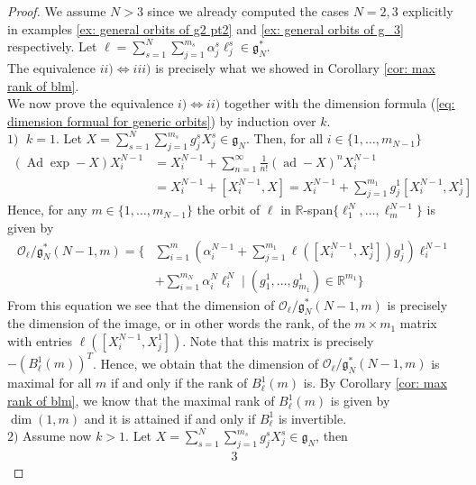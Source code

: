 \documentclass[10pt,a4paper]{amsart}
\newcommand{\Adjoint}{\operatorname{Ad}}
\newcommand{\fancyg}{\mathfrak{g}}
\begin{document}
	\begin{proof}
		We assume $N > 3$ since we already computed the cases $N=2,3$ explicitly in examples \ref{ex: general orbits of g2 pt2} and \ref{ex: general orbits of g_3} respectively.
		Let $\ell = \sum_{s=1}^{N}\sum_{j=1}^{m_s}\alpha_j^s\ell_j^s \in \fancyg_{N}^*$.\\
		The equivalence $ii) \iff iii)$ is precisely what we showed in Corollary \ref{cor: max rank of blm}.\\   
		We now prove the equivalence $i) \iff ii)$ together with the dimension formula (\ref{eq: dimension formual for generic orbits}) by induction over $k$.\\
		$1)\;$ $k = 1$. Let $X = \sum_{s=1}^{N}\sum_{j=1}^{m_s}g_j^sX_j^s \in \fancyg_{N}$. Then, for all $i \in \{1, \ldots, m_{N-1}\}$
		\begin{align*}
			(\Adjoint \operatorname{exp}-X)X_i^{N-1} &= X_i^{N-1} + \sum_{n=1}^{\infty}\frac{1}{n!}(\operatorname{ad}-X)^n X_i^{N-1}\\
			&=  X_i^{N-1} + [X_i^{N-1}, X] = X_i^{N-1} + \sum_{j=1}^{m_1}g_j^1[X_i^{N-1},X_j^1]
		\end{align*}
		Hence, for any $m \in \{1, \ldots, m_{N-1}\}$ the orbit of $\ell$ in $\mathbb{R}$-span$\{\ell_1^N, \ldots, \ell_{m}^{N-1}\}$ is given by
		\begin{align*}
			\mathcal{O}_{\ell} / \fancyg_N^*(N-1, m) = \Bigg\{ 
			& \sum_{i=1}^{m} \left(\alpha_i^{N-1} + \sum_{j=1}^{m_1} \ell([X_i^{N-1}, X_j^1])g_j^1\right) \ell_i^{N-1} \\
			& + \sum_{i=1}^{m_N} \alpha_i^N \ell_i^N \; \Big| \; (g_1^1, \ldots, g_{m_1}^1) \in \mathbb{R}^{m_1} \Bigg\}
		\end{align*}
		From this equation we see that the dimension of $\mathcal{O}_{\ell} / \fancyg_N^*(N-1, m)$ is precisely the dimension of the image, or in other words the rank, of the $m \times m_1$ matrix with entries $\ell([X_i^{N-1}, X_j^1])$. Note that this matrix is precisely $-(B_{\ell}^{1}(m))^T$. Hence, we obtain that the dimension of $\mathcal{O}_{\ell} / \fancyg_N^*(N-1, m)$ is maximal for all $m$ if and only if the rank of $B_{\ell}^{1}(m)$ is. By Corollary \ref{cor: max rank of blm}, we know that the maximal rank of $B_{\ell}^{1}(m)$ is given by $\dim(1,m)$ and it is attained if and only if $B_{\ell}^1$ is invertible\vspace{5pt}.\\  
		\noindent $2)$ Assume now $k>1$. Let $X = \sum_{s=1}^{N}\sum_{j=1}^{m_s}g_j^sX_j^s \in \fancyg_{N}$, then
		\begin{alignat*}{3}

\end{alignat*}
\end{proof}
\end{document}
